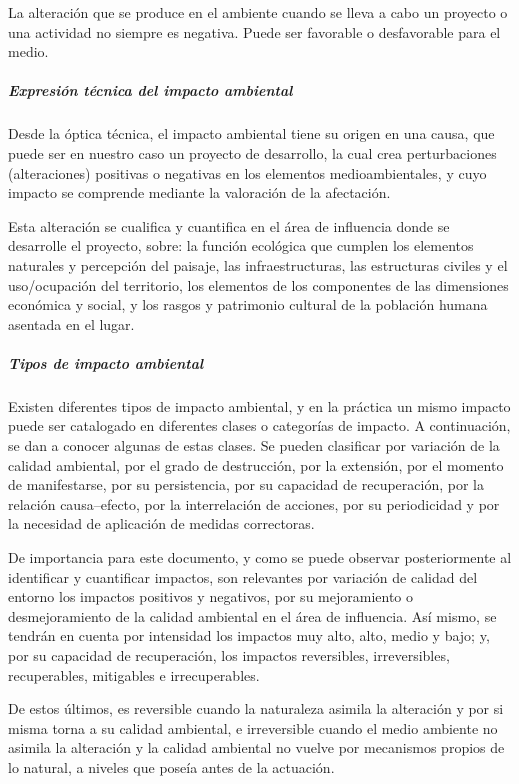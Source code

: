 {\correccionTexto
La alteración que se produce en el ambiente cuando se lleva a cabo un proyecto o una actividad no siempre es negativa.
Puede ser favorable o desfavorable para el medio. 
}

	\subparagraph{Expresión técnica del impacto ambiental}

Desde la óptica técnica, el impacto ambiental tiene su origen en una causa, que puede ser en nuestro caso un proyecto de desarrollo, la cual crea perturbaciones (alteraciones) positivas o negativas en los  elementos  medioambientales, y cuyo impacto se comprende mediante la  valoración  de  la afectación. 
 
Esta alteración se cualifica y cuantifica en el área de influencia donde se desarrolle el proyecto, sobre: la función ecológica que cumplen los elementos naturales y percepción del paisaje, 
las infraestructuras, las estructuras civiles y el uso/ocupación del territorio, los elementos de los componentes de las dimensiones económica y social, y los rasgos y patrimonio cultural de la población humana asentada en el lugar.

	\subparagraph{Tipos de impacto ambiental}
 
Existen diferentes tipos de impacto ambiental, y en la práctica un mismo impacto puede ser catalogado en diferentes clases o categorías de impacto.
A continuación, se dan a conocer algunas de estas clases. Se pueden clasificar por variación de la calidad ambiental, por el grado de  destrucción, por la extensión,  por  el  momento  de  manifestarse,  por  su  persistencia,  por  su capacidad  de  recuperación,  por  la  relación  causa–efecto,  por  la  interrelación  de  acciones,  por  su periodicidad y por la necesidad de aplicación de medidas correctoras. 
 
 
De importancia para este documento, y como se puede observar posteriormente al identificar y cuantificar impactos, son relevantes por variación de calidad del entorno los impactos positivos y negativos,  por  su  mejoramiento  o  desmejoramiento  de  la  calidad  ambiental  en  el  área  de influencia.
Así mismo, se tendrán en cuenta por intensidad los impactos muy alto, alto, medio y bajo; y, por su capacidad de recuperación, los impactos reversibles, irreversibles, recuperables, mitigables e irrecuperables.  

De estos últimos, es reversible cuando la naturaleza asimila la alteración y por si misma torna a su  calidad  ambiental, e irreversible cuando el medio  ambiente  no  asimila  la alteración  y  la calidad ambiental  no  vuelve  por  mecanismos  propios  de  lo  natural,  a  niveles  que  poseía  antes  de  la actuación. 
 
